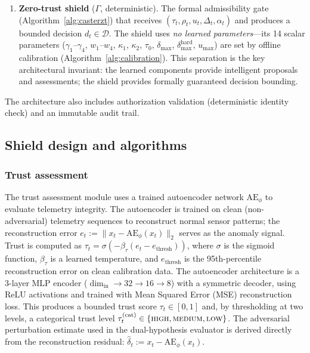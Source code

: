 \documentclass[10pt,journal,compsoc]{IEEEtran}
\begin{document}
\begin{enumerate}
    Uncertainty is computed by applying Monte Carlo Dropout~\cite{gal2016dropout} over the GNN encoder with $T=20$ stochastic forward passes.
    The predictive uncertainty is $u_t = \frac{1}{T}\sum_{i=1}^{T}\mathrm{Var}[\pi_{\theta}^{(i)}(a \mid s_t)]$, where each $\pi_\theta^{(i)}$ uses a different dropout mask.
    This provides a calibrated estimate of the model's epistemic uncertainty.
    \item \textbf{Zero-trust shield} ($\Gamma$, deterministic).
    The formal admissibility gate (Algorithm~\ref{alg:casterzt}) that receives $(\tau_t, \rho_t, u_t, \Delta_t, \alpha_t)$ and produces a bounded decision $d_t \in \mathcal{D}$.
    The shield uses \emph{no learned parameters}---its 14 scalar parameters ($\gamma_1$--$\gamma_4$, $w_1$--$w_4$, $\kappa_1$, $\kappa_2$, $\tau_0$, $\delta_{\max}$, $\delta_{\max}^{\mathrm{hard}}$, $u_{\max}$) are set by offline calibration (Algorithm~\ref{alg:calibration}).
    This separation is the key architectural invariant: the learned components provide intelligent proposals and assessments; the shield provides formally guaranteed decision bounding.
\end{enumerate}
The architecture also includes authorization validation (deterministic identity check) and an immutable audit trail.


\subsection{Shield design and algorithms}

\subsubsection{Trust assessment}
\label{sec:trust_assessment}
The trust assessment module uses a trained autoencoder network $\mathrm{AE}_\phi$ to evaluate telemetry integrity.
The autoencoder is trained on clean (non-adversarial) telemetry sequences to reconstruct normal sensor patterns; the reconstruction error $e_t := \|x_t - \mathrm{AE}_\phi(x_t)\|_2$ serves as the anomaly signal.
Trust is computed as $\tau_t = \sigma(-\beta_\tau (e_t - e_{\mathrm{thresh}}))$, where $\sigma$ is the sigmoid function, $\beta_\tau$ is a learned temperature, and $e_{\mathrm{thresh}}$ is the 95th-percentile reconstruction error on clean calibration data.
The autoencoder architecture is a 3-layer MLP encoder ($\dim_{\text{in}} \to 32 \to 16 \to 8$) with a symmetric decoder, using ReLU activations and trained with Mean Squared Error (MSE) reconstruction loss.
This produces a bounded trust score $\tau_t \in [0,1]$ and, by thresholding at two levels, a categorical trust level $\tau_t^{(\mathrm{cat})} \in \{\textsc{high}, \textsc{medium}, \textsc{low}\}$.
The adversarial perturbation estimate used in the dual-hypothesis evaluator is derived directly from the reconstruction residual: $\hat{\delta}_t := x_t - \mathrm{AE}_\phi(x_t)$.
\end{document}
